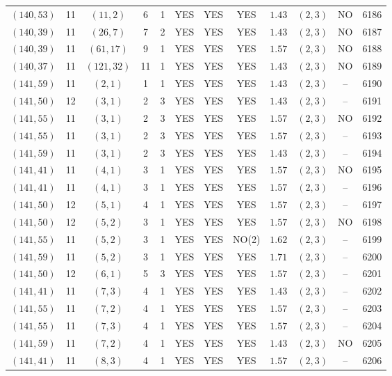 \begin{longtable}{|c|c|c|c|c|c|c|c|c|c|c|c|}
$(140,53)$ & 11 & $(11,2)$ & 6 & 1 & YES & YES & YES & $1.43$ & $(2,3)$ & NO & 6186\\
$(140,39)$ & 11 & $(26,7)$ & 7 & 2 & YES & YES & YES & $1.43$ & $(2,3)$ & NO & 6187\\
$(140,39)$ & 11 & $(61,17)$ & 9 & 1 & YES & YES & YES & $1.57$ & $(2,3)$ & NO & 6188\\
$(140,37)$ & 11 & $(121,32)$ & 11 & 1 & YES & YES & YES & $1.43$ & $(2,3)$ & NO & 6189\\
$(141,59)$ & 11 & $(2,1)$ & 1 & 1 & YES & YES & YES & $1.43$ & $(2,3)$ & -- & 6190\\
$(141,50)$ & 12 & $(3,1)$ & 2 & 3 & YES & YES & YES & $1.43$ & $(2,3)$ & -- & 6191\\
$(141,55)$ & 11 & $(3,1)$ & 2 & 3 & YES & YES & YES & $1.57$ & $(2,3)$ & NO & 6192\\
$(141,55)$ & 11 & $(3,1)$ & 2 & 3 & YES & YES & YES & $1.57$ & $(2,3)$ & -- & 6193\\
$(141,59)$ & 11 & $(3,1)$ & 2 & 3 & YES & YES & YES & $1.43$ & $(2,3)$ & -- & 6194\\
$(141,41)$ & 11 & $(4,1)$ & 3 & 1 & YES & YES & YES & $1.57$ & $(2,3)$ & NO & 6195\\
$(141,41)$ & 11 & $(4,1)$ & 3 & 1 & YES & YES & YES & $1.57$ & $(2,3)$ & -- & 6196\\
$(141,50)$ & 12 & $(5,1)$ & 4 & 1 & YES & YES & YES & $1.57$ & $(2,3)$ & -- & 6197\\
$(141,50)$ & 12 & $(5,2)$ & 3 & 1 & YES & YES & YES & $1.57$ & $(2,3)$ & NO & 6198\\
$(141,55)$ & 11 & $(5,2)$ & 3 & 1 & YES & YES & NO(2) & $1.62$ & $(2,3)$ & -- & 6199\\
$(141,59)$ & 11 & $(5,2)$ & 3 & 1 & YES & YES & YES & $1.71$ & $(2,3)$ & -- & 6200\\
$(141,50)$ & 12 & $(6,1)$ & 5 & 3 & YES & YES & YES & $1.57$ & $(2,3)$ & -- & 6201\\
$(141,41)$ & 11 & $(7,3)$ & 4 & 1 & YES & YES & YES & $1.43$ & $(2,3)$ & -- & 6202\\
$(141,55)$ & 11 & $(7,2)$ & 4 & 1 & YES & YES & YES & $1.57$ & $(2,3)$ & -- & 6203\\
$(141,55)$ & 11 & $(7,3)$ & 4 & 1 & YES & YES & YES & $1.57$ & $(2,3)$ & -- & 6204\\
$(141,59)$ & 11 & $(7,2)$ & 4 & 1 & YES & YES & YES & $1.43$ & $(2,3)$ & NO & 6205\\
$(141,41)$ & 11 & $(8,3)$ & 4 & 1 & YES & YES & YES & $1.57$ & $(2,3)$ & -- & 6206\\

\end{longtable}
